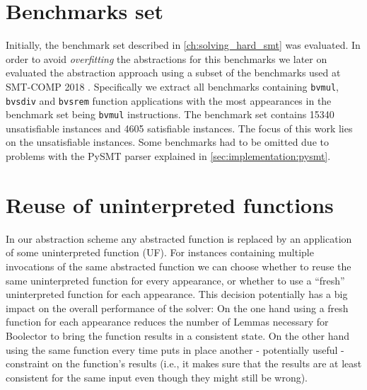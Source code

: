 \section{Benchmarks set}
Initially, the benchmark set described in   \ref{ch:solving_hard_smt} was evaluated.
In order to avoid \textit{overfitting} the abstractions for this benchmarks we later on
evaluated the abstraction approach using a subset of the benchmarks used at SMT-COMP 2018 \cite{SMTCOMP18}.
Specifically we extract all benchmarks containing \texttt{bvmul}, \texttt{bvsdiv} and \texttt{bvsrem} function applications with the most appearances in the benchmark set being \texttt{bvmul} instructions.
The benchmark set contains 15340 unsatisfiable instances and 4605 satisfiable instances. The focus of this work lies on the unsatisfiable instances.
 Some benchmarks had to be omitted due to problems with the PySMT parser explained in \ref{sec:implementation:pysmt}.

\section{Reuse of uninterpreted functions}
In our abstraction scheme any abstracted function is replaced by an application of some uninterpreted function (UF).
For instances containing multiple invocations of the same abstracted function we can choose whether to reuse the same uninterpreted function for every appearance,
or whether to use a \enquote{fresh} uninterpreted function for each appearance.
This decision potentially has a big impact on the overall performance of the solver:
On the one hand using a fresh function for each appearance reduces the number of Lemmas necessary for Boolector to bring the function results in a consistent state.
On the other hand using the same function every time puts in place another - potentially useful - constraint on the function's results
(i.e., it makes sure that the results are at least consistent for the same input even though they might still be wrong).

